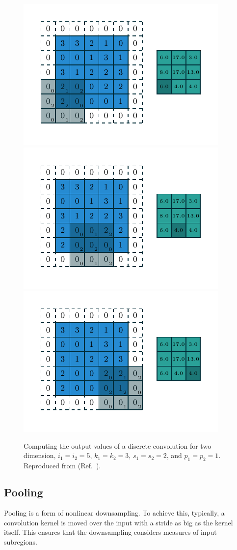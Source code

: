 \begin{figure}
    \includegraphics[width=0.32\linewidth]{ANN/images/numerical_padding_strides_06.pdf}
    \includegraphics[width=0.32\linewidth]{ANN/images/numerical_padding_strides_07.pdf}
    \includegraphics[width=0.32\linewidth]{ANN/images/numerical_padding_strides_08.pdf}
    \caption[Convolution operation]{Computing the output values
        of a discrete convolution for two dimension, $i_1 = i_2 = 5$, $k_1 = k_2 = 3$,
        $s_1 = s_2 = 2$, and $p_1 = p_2 = 1$.
        Reproduced from  (Ref.~\cite{Dumoulin2016}).
    }
    \label{fig:numerical_padding_strides}
\end{figure}


\subsection{Pooling}\label{sec:pooling}
Pooling is a form of nonlinear downsampling.
To achieve this, typically, a convolution kernel is moved over the input with a stride as big as the kernel itself.
This ensures that the downsampling considers measures of input subregions.

